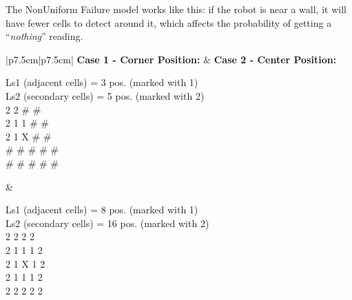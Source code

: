 \documentclass{article}
\begin{document}
The NonUniform Failure model works like this: if the robot is near a wall, it will have fewer cells to detect around it, which affects the probability of getting a ``\textit{nothing}'' reading.

\begin{table}[H]
    \centering
    \renewcommand{\arraystretch}{1.5}
    \begin{tabular}{|p{7.5cm}|p{7.5cm}|}
        \hline
        \textbf{Case 1 - Corner Position:} & \textbf{Case 2 - Center Position:} \\ \hline
        \begin{minipage}{\linewidth}
            \centering
            \vspace{0.3cm}
            Ls1 (adjacent cells) = 3 pos. (marked with 1) \\
            Ls2 (secondary cells) = 5 pos. (marked with 2) \\
            \vspace{0.4cm}
             2 2 \# \# \\
            2 1 1 \# \# \\
            2 1 X \# \# \\
            \# \# \# \# \# \\
            \# \# \# \# \# \\
            \vspace{0.3cm}
        \end{minipage} &
        \begin{minipage}{\linewidth}
            \centering
            \vspace{0.3cm}
            Ls1 (adjacent cells) = 8 pos. (marked with 1) \\
            Ls2 (secondary cells) = 16 pos. (marked with 2) \\
            \vspace{0.4cm}
             2 2 2 2 \\
            2 1 1 1 2 \\
            2 1 X 1 2 \\
            2 1 1 1 2 \\
            2 2 2 2 2 \\
            \vspace{0.3cm}
        \end{minipage} \\ 
        \hline
    \end{tabular}
    \caption{Comparison of sensor readings in corner and center positions}
    \label{tab:sensor_positions}
\end{table}
\end{document}
